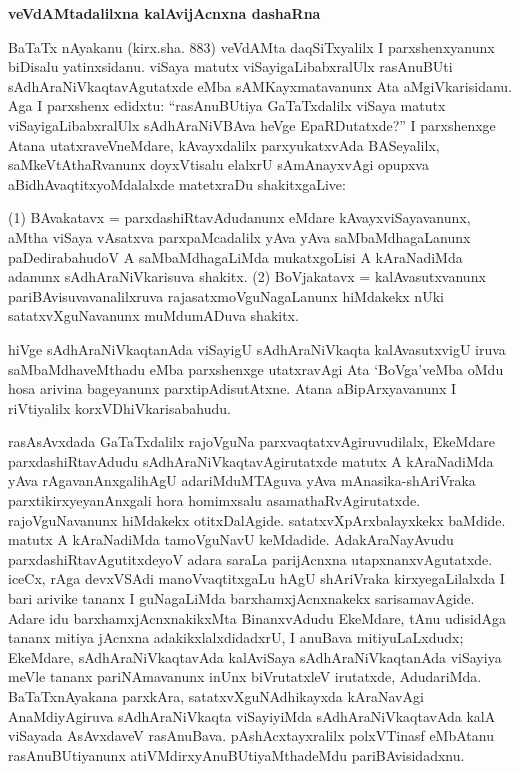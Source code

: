 \smallskip
\begin{center}
{\Large\bf veVdAMtadalilxna kalAvijAcnxna dashaRna}
\end{center}

BaTaTx nAyakanu (kirx.sha. 883) veVdAMta daqSiTxyalilx I parxshenxyanunx biDisalu yatinxsidanu. viSaya matutx viSayigaLibabxralUlx rasAnuBUti sAdhAraNiVkaqtavAgutatxde eMba sAMKayxmatavanunx Ata aMgiVkarisidanu. Aga I parxshenx edidxtu: ``rasAnuBUtiya GaTaTxdalilx viSaya matutx viSayigaLibabxralUlx sAdhAraNiVBAva heVge EpaRDutatxde?'' I parxshenxge Atana utatxraveVneMdare, kAvayxdalilx parxyukatxvAda BASeyalilx, saMkeVtAthaR\-vanunx doyxVtisalu elalxrU sAmAnayxvAgi opupxva aBidhAvaqtitxyoMdalalxde matetxraDu shakitx\-gaLive:

(1) BAvakatavx = parxdashiRtavAdudanunx eMdare kAvayxviSayavanunx, aMtha viSaya vAsatxva parxpaMcadalilx yAva yAva saMbaMdhagaLanunx paDedirabahudoV A saMbaMdhagaLiMda mukatxgoLisi A kAraNadiMda adanunx sAdhAraNiVkarisuva shakitx. (2) BoVjakatavx = kalAvasutxvanunx pariBAvisuvavanalilxruva rajasatxmoVguNagaLanunx hiMdakekx nUki satatxvXguNavanunx muMdumADuva shakitx.

hiVge sAdhAraNiVkaqtanAda viSayigU sAdhAraNiVkaqta kalAvasutxvigU iruva saMbaMdhaveMthadu eMba parxshenxge utatxravAgi Ata `BoVga'veMba oMdu hosa arivina bageyanunx parxtipAdisutAtxne. Atana aBipArxyavanunx I riVtiyalilx korxVDhiVkarisabahudu.

rasAsAvxdada GaTaTxdalilx rajoVguNa parxvaqtatxvAgiruvudilalx, EkeMdare parxdashiRta\break\-vAdudu sAdhAraNiVkaqtavAgirutatxde matutx A kAraNadiMda yAva rAgavanAnxgali\break hAgU adariMduMTAguva yAva mAnasika-shAriVraka parxtikirxyeyanAnxgali hora homimxsalu asamathaRvAgirutatxde. rajoVguNavanunx hiMdakekx otitxDalAgide. satatxvX\break pArxbalayxkekx baMdide. matutx A kAraNadiMda tamoVguNavU keMdadide. AdakAraNa\break yAvudu parxdashiRtavAgutitxdeyoV adara saraLa parijAcnxna utapxnanxvAgutatxde. iceCx, rAga devxVSAdi manoVvaqtitxgaLu hAgU shAriVraka kirxyegaLilalxda I bari arivike tananx I guNagaLiMda barxhamxjAcnxnakekx sarisamavAgide. Adare idu barxhamxjAcnxnakikxMta BinanxvAdudu EkeMdare, tAnu udisidAga tananx mitiya jAcnxna adakikxlalxdidadxrU, I anuBava miti\-yuLaLxdudx; EkeMdare, sAdhAraNiVkaqtavAda kalAviSaya sAdhAraNiVkaqtanAda viSayiya meVle tananx pariNAmavanunx inUnx biVrutatxleV irutatxde, AdudariMda. BaTaTxnAyakana parxkAra, satatxvXguNAdhikayxda kAraNavAgi AnaMdiyAgiruva sAdhAraNiVkaqta viSayi\-yiMda sAdhAraNiVkaqtavAda kalA viSayada AsAvxdaveV rasAnuBava. pAshAcxtayxralilx polxVTinasf eMbAtanu rasAnuBUtiyanunx atiVMdirxyAnuBUtiyaMthadeMdu pariBAvisidadxnu.

